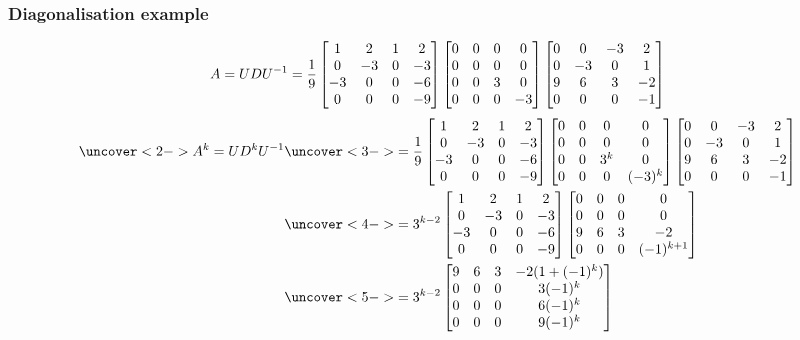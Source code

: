 \documentclass[9pt]{beamer}
\begin{document}
\begin{frame}[t]
 \frametitle{Diagonalisation example}

 \[ A = UDU^{-1} =
    \frac{1}{9}
        \left[\begin{matrix} 1 &  2 &  1 &  2 \\
             0 & -3 &  0 & -3 \\
            -3 &  0 &  0 & -6 \\
             0 &  0 &  0 & -9 \end{matrix}\right] 
        \left[\begin{matrix} 0 &  0 &  0 &  0 \\
             0 &  0 &  0 &  0 \\
             0 &  0 &  3 &  0 \\
             0 &  0 &  0 & -3 \end{matrix}\right]
        \left[\begin{matrix} 0 &  0 & -3 &  2 \\
             0 & -3 &  0 &  1 \\ 
             9 &  6 &  3 & -2 \\ 
             0 &  0 &  0 & -1
        \end{matrix}\right]
 \] 
 \reminderbar
 \begin{align*}
  \uc<2->{A^k = UD^kU^{-1}} &\uc<3->{= 
   \frac{1}{9}
   \bbm 1 &  2 & 1 &  2 \\
        0 & -3 & 0 & -3 \\
       -3 &  0 & 0 & -6 \\
        0 &  0 & 0 & -9 \ebm
   \bbm 0 & 0 & 0 &  0 \\
        0 & 0 & 0 &  0 \\
        0 & 0 & 3^k &  0 \\
        0 & 0 & 0 & (-3)^k \ebm
   \bbm 0 &  0 & -3 &  2 \\
        0 & -3 &  0 &  1 \\ 
        9 &  6 &  3 & -2 \\ 
        0 &  0 &  0 & -1 \ebm} \\
   &\uc<4->{= 
   3^{k-2}
   \bbm 1 &  2 & 1 &  2 \\
        0 & -3 & 0 & -3 \\
       -3 &  0 & 0 & -6 \\
        0 &  0 & 0 & -9 \ebm
   \bbm 0 &  0 &  0 &  0 \\
        0 &  0 &  0 &  0 \\ 
        9 &  6 &  3 & -2 \\ 
        0 &  0 &  0 & (-1)^{k+1} \ebm} \\
  &\uc<5->{= 
   3^{k-2}
   \bbm 9 &  6 &  3 & -2(1+(-1)^k) \\
        0 &  0 &  0 & 3(-1)^k \\
        0 &  0 &  0 & 6(-1)^k \\
        0 &  0 &  0 & 9(-1)^k \ebm}
 \end{align*}
\end{frame}
\end{document}
